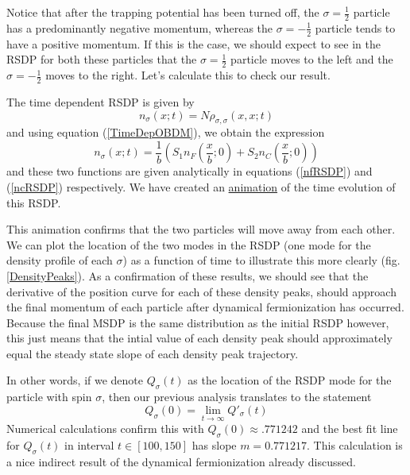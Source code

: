 \documentclass[onecolumn,english,aps,pra]{revtex4}
\begin{document}
Notice that after the trapping potential has been turned off, the $\sigma = \frac{1}{2}$ particle has a predominantly negative momentum, whereas the $\sigma = -\frac{1}{2}$ particle tends to have a positive momentum. If this is the case, we should expect to see in the RSDP for both these particles that the $\sigma = \frac{1}{2}$ particle moves to the left and the $\sigma = -\frac{1}{2}$ moves to the right. Let's calculate this to check our result.

The time dependent RSDP is given by 
\begin{equation}
n_{\sigma}(x;t) = N \rho_{\sigma, \sigma}(x,x;t)
\end{equation}
and using equation (\ref{TimeDepOBDM}), we obtain the expression
\begin{equation}
n_{\sigma}(x;t) = \frac{1}{b}\left(S_1 n_F\left(\frac{x}{b};0\right) + S_2 n_C \left(\frac{x}{b}; 0\right) \right)
\end{equation}
and these two functions are given analytically in equations (\ref{nfRSDP}) and (\ref{ncRSDP}) respectively. We have created an \href{https://github.com/TimSkaras/UltraColdAtoms/blob/master/Plots/TimeEvolutionNS-RSDP.gif}{animation} of the time evolution of this RSDP.

This animation confirms that the two particles will move away from each other. We can plot the location of the two modes in the RSDP (one mode for the density profile of each $\sigma$) as a function of time to illustrate this more clearly (fig. \ref{DensityPeaks}). As a confirmation of these results, we should see that the derivative of the position curve for each of these density peaks, should approach the final momentum of each particle after dynamical fermionization has occurred. Because the final MSDP is the same distribution as the initial RSDP however, this just means that the intial value of each density peak should approximately equal the steady state slope of each density peak trajectory.

In other words, if we denote $Q_\sigma(t)$ as the location of the RSDP mode for the particle with spin $\sigma$, then our previous analysis translates to the statement
\[ Q_\sigma(0) = \lim_{t \rightarrow \infty} Q'_{\sigma}(t) \]
Numerical calculations confirm this with $Q_\sigma(0) \approx .771242$ and the best fit line for $Q_\sigma(t)$ in interval $t \in [100,150]$ has slope $m = 0.771217$. This calculation is a nice indirect result of the dynamical fermionization already discussed.
\end{document}
